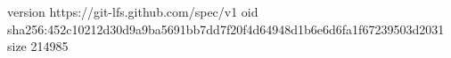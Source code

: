 version https://git-lfs.github.com/spec/v1
oid sha256:452c10212d30d9a9ba5691bb7dd7f20f4d64948d1b6e6d6fa1f67239503d2031
size 214985
